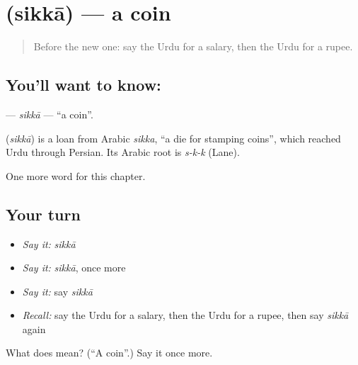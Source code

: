 \section[\texorpdfstring{\ur{سکہ} (sikkā)}{سکہ (sikkā)}]{ (sikkā) — a coin}

\label{lesson:UR-C176-sikka}



\begin{quote}
Before the new one: say the Urdu for a salary, then the Urdu for a rupee.
\end{quote}

\subsection*{You'll want to know: }
\textbf{} — \emph{sikkā} — \textquotedblleft{}a coin\textquotedblright{}.

\begin{cousinweb}
\textbf{} (\emph{sikkā}) is a loan from Arabic \emph{sikka}, \textquotedblleft{}a die for stamping coins\textquotedblright{}, which reached Urdu through Persian. Its Arabic root is \emph{s-k-k} (Lane).
\end{cousinweb}

\begin{grammarlens}[title={What you've built}]
One more word for this chapter.
\end{grammarlens}

\subsection*{Your turn}
\begin{itemize}
\raggedright
  \item \emph{Say it:} \emph{sikkā}
  \item \emph{Say it:} \emph{sikkā}, once more
  \item \emph{Say it:} say \emph{sikkā}
  \item \emph{Recall:} say the Urdu for a salary, then the Urdu for a rupee, then say \emph{sikkā} again
\end{itemize}

\begin{tcolorbox}[breakable,colback=teal!4,colframe=teal!35!black,title={Before you move on}]
What does  mean? (\textquotedblleft{}A coin\textquotedblright{}.) Say it once more.
\end{tcolorbox}
